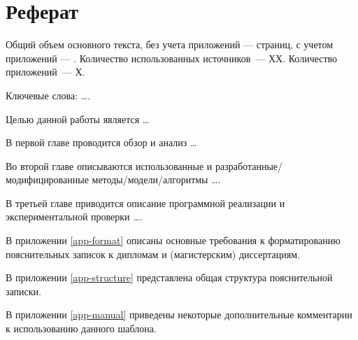 \chapter*{Реферат}
\thispagestyle{plain}

Общий объем основного текста, без учета приложений ---
\pageref{end_of_main_text} страниц, с учетом приложений ---
\pageref{end_of_document}. Количество использованных источников~--- ХХ.
Количество приложений~--- Х.

Ключевые слова: \dots .

Целью данной работы является \dots

В первой главе проводится обзор и анализ \dots 

Во второй главе описываются использованные и разработанные/модифицированные методы/модели/алгоритмы \dots. 

В третьей главе приводится описание программной реализации и экспериментальной проверки \dots.

В приложении \ref{app-format} описаны основные требования к форматированию пояснительных записок к дипломам и (магистерским) диссертациям.

В приложении \ref{app-structure} представлена общая структура пояснительной записки.

В приложении \ref{app-manual} приведены некоторые дополнительные комментарии к использованию данного шаблона.
